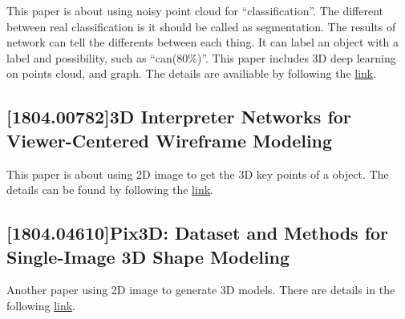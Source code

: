 This paper is about using noisy point cloud for ``classification''.
The different between real classification is it should be called as
segmentation. The results of network can tell the differents between each thing.
It can label an object with a label and possibility, such as ``can(80\%)''.
This paper includes 3D deep learning on points cloud, and graph.
The details are availiable by following the \href{https://arxiv.org/abs/1804.01117}{link}.

\subsection{[1804.00782]3D Interpreter Networks for Viewer-Centered Wireframe
  Modeling}

This paper is about using 2D image to get the 3D key points of a object.
The details can be found by following the
\href{https://arxiv.org/abs/1804.00782}{link}.

\subsection{[1804.04610]Pix3D: Dataset and Methods for Single-Image 3D Shape
  Modeling}

Another paper using 2D image to generate 3D models.
There are details in the following
\href{https://arxiv.org/abs/1804.04610}{link}.




